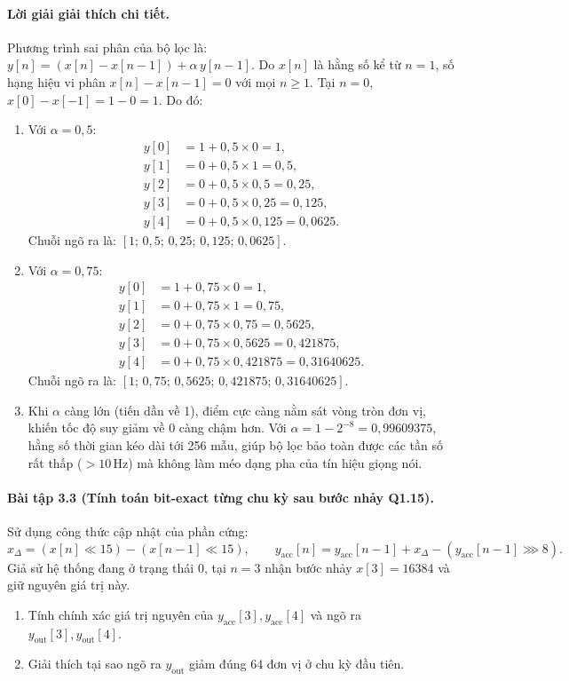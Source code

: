 \paragraph{Lời giải giải thích chi tiết.}
Phương trình sai phân của bộ lọc là: $y[n] = (x[n] - x[n-1]) + \alpha\, y[n-1]$. Do $x[n]$ là hằng số kể từ $n = 1$, số hạng hiệu vi phân $x[n] - x[n-1] = 0$ với mọi $n \ge 1$. Tại $n = 0$, $x[0] - x[-1] = 1 - 0 = 1$. Do đó:
\begin{enumerate}[label=\alph*)]
    \item Với $\alpha = 0{,}5$:
    \begin{align*}
    y[0] &= 1 + 0{,}5 \times 0 = 1,\\
    y[1] &= 0 + 0{,}5 \times 1 = 0{,}5,\\
    y[2] &= 0 + 0{,}5 \times 0{,}5 = 0{,}25,\\
    y[3] &= 0 + 0{,}5 \times 0{,}25 = 0{,}125,\\
    y[4] &= 0 + 0{,}5 \times 0{,}125 = 0{,}0625.
    \end{align*}
    Chuỗi ngõ ra là: $[1;\, 0{,}5;\, 0{,}25;\, 0{,}125;\, 0{,}0625]$.
    \item Với $\alpha = 0{,}75$:
    \begin{align*}
    y[0] &= 1 + 0{,}75 \times 0 = 1,\\
    y[1] &= 0 + 0{,}75 \times 1 = 0{,}75,\\
    y[2] &= 0 + 0{,}75 \times 0{,}75 = 0{,}5625,\\
    y[3] &= 0 + 0{,}75 \times 0{,}5625 = 0{,}421875,\\
    y[4] &= 0 + 0{,}75 \times 0{,}421875 = 0{,}31640625.
    \end{align*}
    Chuỗi ngõ ra là: $[1;\, 0{,}75;\, 0{,}5625;\, 0{,}421875;\, 0{,}31640625]$.
    \item Khi $\alpha$ càng lớn (tiến dần về 1), điểm cực càng nằm sát vòng tròn đơn vị, khiến tốc độ suy giảm về 0 càng chậm hơn. Với $\alpha = 1 - 2^{-8} = 0{,}99609375$, hằng số thời gian kéo dài tới 256 mẫu, giúp bộ lọc bảo toàn được các tần số rất thấp ($> 10\,\text{Hz}$) mà không làm méo dạng pha của tín hiệu giọng nói.
\end{enumerate}

\paragraph{Bài tập 3.3 (Tính toán bit-exact từng chu kỳ sau bước nhảy Q1.15).}
Sử dụng công thức cập nhật của phần cứng:
\[
x_{\Delta} = (x[n] \ll 15) - (x[n-1] \ll 15), \qquad y_{\mathrm{acc}}[n] = y_{\mathrm{acc}}[n-1] + x_{\Delta} - (y_{\mathrm{acc}}[n-1] \ggg 8).
\]
Giả sử hệ thống đang ở trạng thái 0, tại $n = 3$ nhận bước nhảy $x[3] = 16384$ và giữ nguyên giá trị này.
\begin{enumerate}[label=\alph*)]
    \item Tính chính xác giá trị nguyên của $y_{\mathrm{acc}}[3], y_{\mathrm{acc}}[4]$ và ngõ ra $y_{\mathrm{out}}[3], y_{\mathrm{out}}[4]$.
    \item Giải thích tại sao ngõ ra $y_{\mathrm{out}}$ giảm đúng 64 đơn vị ở chu kỳ đầu tiên.
\end{enumerate}

